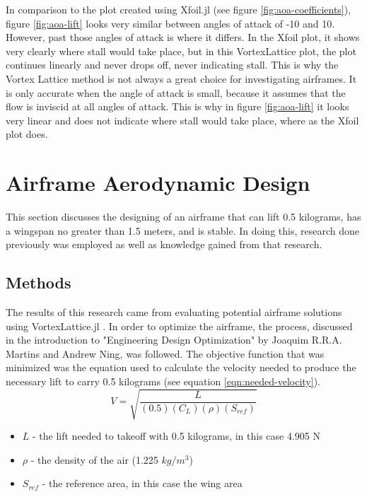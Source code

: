 \documentclass{journal}
\begin{document}
	In comparison to the plot created using Xfoil.jl \cite{McDonnell} (see figure \ref{fig:aoa-coefficients}), figure \ref{fig:aoa-lift} looks very similar between angles of attack of -10 and 10. However, past those angles of attack is where it differs. In the Xfoil plot, it shows very clearly where stall would take place, but in this VortexLattice plot, the plot continues linearly and never drops off, never indicating stall. This is why the Vortex Lattice method is not always a great choice for investigating airframes. It is only accurate when the angle of attack is small, because it assumes that the flow is inviscid at all angles of attack. This is why in figure \ref{fig:aoa-lift} it looks very linear and does not indicate where stall would take place, where as the Xfoil plot does.\\
	
	\section{Airframe Aerodynamic Design}
	
	This section discusses the designing of an airframe that can lift 0.5 kilograms, has a wingspan no greater than 1.5 meters, and is stable. In doing this, research done previously was employed as well as knowledge gained from that research.\\
	
	\subsection{Methods}
	The results of this research came from evaluating potential airframe solutions using VortexLattice.jl \cite{McDonnell-Ning}. In order to optimize the airframe, the process, discussed in the introduction to "Engineering Design Optimization" by Joaquim R.R.A. Martins and Andrew Ning, was followed. The objective function  that was minimized was the equation used to calculate the velocity needed to produce the necessary lift to carry 0.5 kilograms (see equation \ref{eqn:needed-velocity}).\\
	
	\begin{equation}
		V = \sqrt{\frac{L}{(0.5)(C_L)(\rho)(S_{ref})}}
		\label{eqn:needed-velocity}
	\end{equation}
	
	\begin{itemize}
		\item \(L\) - the lift needed to takeoff with 0.5 kilograms, in this case 4.905 N
		\item \(\rho\) - the density of the air (1.225 \(kg/m^3\))
		\item \(S_{ref}\) - the reference area, in this case the wing area
	\end{itemize}
	
\end{document}
